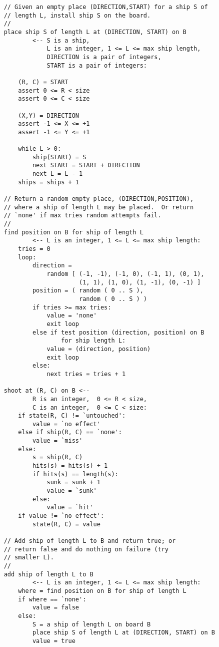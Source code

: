 \documentclass[12pt]{article}
\begin{document}
\begin{verbatim}
    // Given an empty place (DIRECTION,START) for a ship S of
    // length L, install ship S on the board.
    //
    place ship S of length L at (DIRECTION, START) on B
            <-- S is a ship,
                L is an integer, 1 <= L <= max ship length,
                DIRECTION is a pair of integers,
                START is a pair of integers:

        (R, C) = START
        assert 0 <= R < size
        assert 0 <= C < size

        (X,Y) = DIRECTION
        assert -1 <= X <= +1
        assert -1 <= Y <= +1

        while L > 0:
            ship(START) = S
            next START = START + DIRECTION
            next L = L - 1
        ships = ships + 1

    // Return a random empty place, (DIRECTION,POSITION),
    // where a ship of length L may be placed.  Or return
    // `none' if max tries random attempts fail.
    //
    find position on B for ship of length L
            <-- L is an integer, 1 <= L <= max ship length:
        tries = 0
        loop:
            direction =
                random [ (-1, -1), (-1, 0), (-1, 1), (0, 1),
                         (1, 1), (1, 0), (1, -1), (0, -1) ]
            position = ( random ( 0 .. S ),
                         random ( 0 .. S ) )
            if tries >= max tries:
                value = 'none'
                exit loop
            else if test position (direction, position) on B
                    for ship length L:
                value = (direction, position)
                exit loop
            else:
                next tries = tries + 1

    shoot at (R, C) on B <--
            R is an integer,  0 <= R < size,
            C is an integer,  0 <= C < size:
        if state(R, C) != `untouched':
            value = `no effect'
        else if ship(R, C) == `none':
            value = `miss'
        else:
            s = ship(R, C)
            hits(s) = hits(s) + 1
            if hits(s) == length(s):
                sunk = sunk + 1
                value = `sunk'
            else:
                value = `hit'
        if value != `no effect':
            state(R, C) = value

    // Add ship of length L to B and return true; or
    // return false and do nothing on failure (try
    // smaller L).
    //
    add ship of length L to B
            <-- L is an integer, 1 <= L <= max ship length:
        where = find position on B for ship of length L
        if where == `none':
            value = false
        else:
            S = a ship of length L on board B
            place ship S of length L at (DIRECTION, START) on B
            value = true


\end{verbatim}
\end{document}
